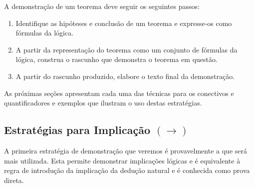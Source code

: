 A demonstração de um teorema deve seguir os seguintes passos:
\begin{enumerate}
  \item Identifique as hipóteses e conclusão de um teorema e
    expresse-os como fórmulas da lógica.
  \item A partir da representação do teorema como um conjunto de
    fórmulas da lógica, construa o rascunho que demonstra o teorema
    em questão.
  \item A partir do rascunho produzido, elabore o texto final da demonstração.
\end{enumerate}

As próximas seções apresentam
cada uma das técnicas para os conectivos e quantificadores e exemplos
que ilustram o uso destas estratégias.

\subsection{Estratégias para Implicação $(\to)$}

A primeira estratégia de demonstração que veremos é provavelmente a
que será mais utilizada. Esta permite demonstrar implicações lógicas
e é equivalente à regra de introdução da implicação da dedução
natural e é conhecida como prova direta.

